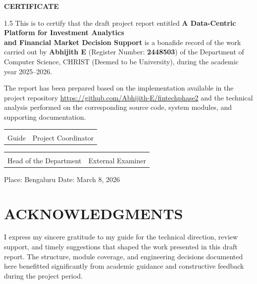 \documentclass[12pt,a4paper]{report}
\newcommand{\projecttitle}{A Data-Centric Platform for Investment Analytics\\and Financial Market Decision Support}
\newcommand{\studentname}{Abhijith E}
\newcommand{\regno}{2448503}
\newcommand{\reportdate}{March 8, 2026}
\newcommand{\repolink}{https://github.com/Abhijith-E/fintechphase2}
\begin{document}
\begin{titlepage}
\thispagestyle{empty}
\centering
\vspace*{0.7in}
{\fontsize{16}{18}\selectfont\bfseries CERTIFICATE\par}
\vspace{0.45in}
\begin{spacing}{1.5}
\noindent This is to certify that the draft project report entitled \textbf{\projecttitle} is a bonafide record of the work carried out by \textbf{\studentname} (Register Number: \textbf{\regno}) of the Department of Computer Science, CHRIST (Deemed to be University), during the academic year 2025--2026.

\vspace{0.25in}
\noindent The report has been prepared based on the implementation available in the project repository \url{\repolink} and the technical analysis performed on the corresponding source code, system modules, and supporting documentation.
\end{spacing}

\vspace{1.6in}
\begin{tabular}{p{2.4in} p{2.4in}}
\centering\hrulefill & \centering\hrulefill \tabularnewline
\centering Guide & \centering Project Coordinator \tabularnewline
\end{tabular}

\vspace{1.1in}
\begin{tabular}{p{2.4in} p{2.4in}}
\centering\hrulefill & \centering\hrulefill \tabularnewline
\centering Head of the Department & \centering External Examiner \tabularnewline
\end{tabular}

\vfill
\noindent Place: Bengaluru \hfill Date: \reportdate
\end{titlepage}

\setcounter{page}{3}
\pagestyle{reportstyle}

\chapter*{ACKNOWLEDGMENTS}
I express my sincere gratitude to my guide for the technical direction, review support, and timely suggestions that shaped the work presented in this draft report. The structure, module coverage, and engineering decisions documented here benefitted significantly from academic guidance and constructive feedback during the project period.
\end{document}

